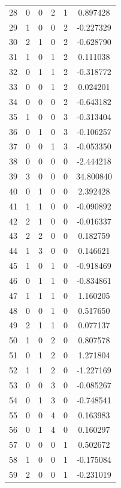 \documentclass[preprint,12pt]{elsarticle}
\begin{document}
\begin{table}
\begin{minipage}[h!]{0.23\textwidth}
{\begin{tabular}{|c|ccccc|}
28 &   0 &   0 &   2 &   1 &   0.897428 \\
29 &   1 &   0 &   0 &   2 &  -0.227329 \\
30 &   2 &   1 &   0 &   2 &  -0.628790 \\
31 &   1 &   0 &   1 &   2 &   0.111038 \\
32 &   0 &   1 &   1 &   2 &  -0.318772 \\
33 &   0 &   0 &   1 &   2 &   0.024201 \\
34 &   0 &   0 &   0 &   2 &  -0.643182 \\
35 &   1 &   0 &   0 &   3 &  -0.313404 \\
36 &   0 &   1 &   0 &   3 &  -0.106257 \\
37 &   0 &   0 &   1 &   3 &  -0.053350 \\
38 &   0 &   0 &   0 &   0 &  -2.444218 \\
39 &   3 &   0 &   0 &   0 &  34.800840 \\
40 &   0 &   1 &   0 &   0 &   2.392428 \\
41 &   1 &   1 &   0 &   0 &  -0.090892 \\
42 &   2 &   1 &   0 &   0 &  -0.016337 \\
43 &   2 &   2 &   0 &   0 &   0.182759 \\
44 &   1 &   3 &   0 &   0 &   0.146621 \\
45 &   1 &   0 &   1 &   0 &  -0.918469 \\
46 &   0 &   1 &   1 &   0 &  -0.834861 \\
47 &   1 &   1 &   1 &   0 &   1.160205 \\
48 &   0 &   0 &   1 &   0 &   0.517650 \\
49 &   2 &   1 &   1 &   0 &   0.077137 \\
50 &   1 &   0 &   2 &   0 &   0.807578 \\
51 &   0 &   1 &   2 &   0 &   1.271804 \\
52 &   1 &   1 &   2 &   0 &  -1.227169 \\
53 &   0 &   0 &   3 &   0 &  -0.085267 \\
54 &   0 &   1 &   3 &   0 &  -0.748541 \\
55 &   0 &   0 &   4 &   0 &   0.163983 \\
56 &   0 &   1 &   4 &   0 &   0.160297 \\
57 &   0 &   0 &   0 &   1 &   0.502672 \\
58 &   1 &   0 &   0 &   1 &  -0.175084 \\
59 &   2 &   0 &   0 &   1 &  -0.231019 \\

\end{tabular}}
\end{minipage}
\end{table}
\end{document}
